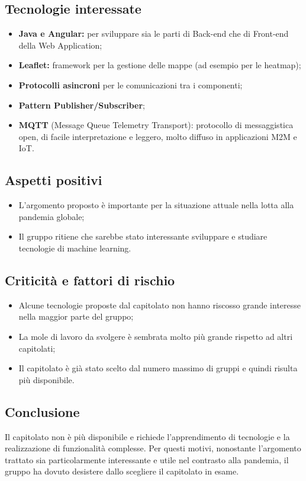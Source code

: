 \subsection{Tecnologie interessate}
\begin{itemize}
    \item \textbf{Java e Angular:} per sviluppare sia le parti di Back-end che di Front-end della Web Application;
    \item \textbf{Leaflet:} framework per la gestione delle mappe (ad esempio per le heatmap);
    \item \textbf{Protocolli asincroni} per le comunicazioni tra i componenti;
    \item \textbf{Pattern Publisher/Subscriber};
    \item \textbf{MQTT} (Message Queue Telemetry Transport): protocollo di messaggistica open, di facile interpretazione e leggero, molto diffuso in applicazioni M2M e IoT.
\end{itemize}

\subsection{Aspetti positivi}
\begin{itemize}
    \item L'argomento proposto è importante per la situazione attuale nella lotta alla pandemia globale;
    \item Il gruppo ritiene che sarebbe stato interessante sviluppare e studiare tecnologie di machine learning.
\end{itemize}

\subsection{Criticità e fattori di rischio}
\begin{itemize}
    \item Alcune tecnologie proposte dal capitolato non hanno riscosso grande interesse nella maggior parte del gruppo;
    \item La mole di lavoro da svolgere è sembrata molto più grande rispetto ad altri capitolati;
    \item Il capitolato è già stato scelto dal numero massimo di gruppi e quindi risulta più disponibile.
\end{itemize}
\subsection{Conclusione}
Il capitolato non è più disponibile e richiede l'apprendimento di tecnologie e la realizzazione di funzionalità complesse. Per questi motivi, 
nonostante l'argomento trattato sia particolarmente interessante e utile nel contrasto alla pandemia, il gruppo ha dovuto 
desistere dallo scegliere il capitolato in esame.